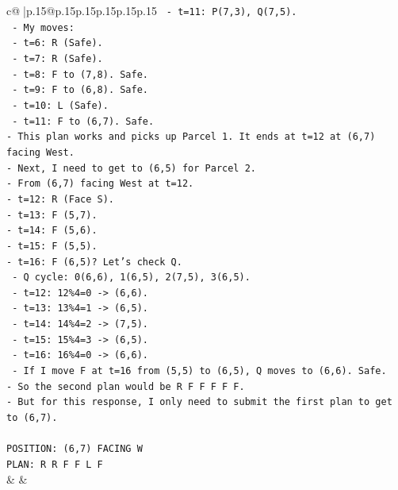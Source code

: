 \documentclass{article}
\begin{document}
{\begin{supertabular}{c@{$\;$}|p{.15\linewidth}@{}p{.15\linewidth}p{.15\linewidth}p{.15\linewidth}p{.15\linewidth}p{.15\linewidth}}
{{{\texttt{  {-} t=11: P(7,3), Q(7,5).} \\
\texttt{  {-} My moves:} \\
\texttt{    {-} t=6: R (Safe).} \\
\texttt{    {-} t=7: R (Safe).} \\
\texttt{    {-} t=8: F to (7,8). Safe.} \\
\texttt{    {-} t=9: F to (6,8). Safe.} \\
\texttt{    {-} t=10: L (Safe).} \\
\texttt{    {-} t=11: F to (6,7). Safe.} \\
\texttt{{-} This plan works and picks up Parcel 1. It ends at t=12 at (6,7) facing West.} \\
\texttt{{-} Next, I need to get to (6,5) for Parcel 2.} \\
\texttt{{-} From (6,7) facing West at t=12.} \\
\texttt{{-} t=12: R (Face S).} \\
\texttt{{-} t=13: F (5,7).} \\
\texttt{{-} t=14: F (5,6).} \\
\texttt{{-} t=15: F (5,5).} \\
\texttt{{-} t=16: F (6,5)? Let's check Q.} \\
\texttt{  {-} Q cycle: 0(6,6), 1(6,5), 2(7,5), 3(6,5).} \\
\texttt{  {-} t=12: 12\%4=0 {-}> (6,6).} \\
\texttt{  {-} t=13: 13\%4=1 {-}> (6,5).} \\
\texttt{  {-} t=14: 14\%4=2 {-}> (7,5).} \\
\texttt{  {-} t=15: 15\%4=3 {-}> (6,5).} \\
\texttt{  {-} t=16: 16\%4=0 {-}> (6,6).} \\
\texttt{  {-} If I move F at t=16 from (5,5) to (6,5), Q moves to (6,6). Safe.} \\
\texttt{{-} So the second plan would be R F F F F F.} \\
\texttt{{-} But for this response, I only need to submit the first plan to get to (6,7).} \\
\\ 
\texttt{POSITION: (6,7) FACING W} \\
\texttt{PLAN: R R F F L F} \\
            }
        }
    }
    & & \\ \\


\end{supertabular}}
\end{document}
